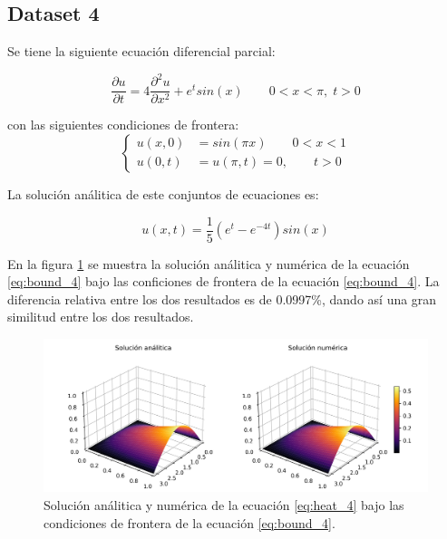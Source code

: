 \subsection{Dataset 4}

Se tiene la siguiente ecuación diferencial parcial:

\begin{equation}
    \frac{\partial u}{\partial t} = 4\frac{\partial^2 u}{\partial x^2}+e^tsin(x)\qquad 0<x<\pi, \; t>0 \label{eq:heat_4}
\end{equation}

con las siguientes condiciones de frontera:
\begin{equation}
    \begin{cases}
        u(x,0) & = sin(\pi x) \qquad 0<x<1 \\
        u(0,t) & =u(\pi,t) = 0, \qquad t>0
    \end{cases} \label{eq:bound_4}
\end{equation}

La solución análitica de este conjuntos de ecuaciones es:

\begin{equation}
    u(x,t)=\frac{1}{5}( e^t-e^{-4t})sin(x) \label{eq:sol_4}
\end{equation}

En la figura \ref{fig:sol_4} se muestra la solución análitica y numérica de la ecuación \ref{eq:bound_4} bajo las conficiones de frontera de la ecuación \ref{eq:bound_4}. La diferencia relativa entre los dos resultados es de 0.0997\%, dando así una gran similitud entre los dos resultados.

\begin{figure}[H]
    \centering
    \includegraphics[width=16cm]{Graphics/surface_4.png}
    \caption{Solución análitica y numérica de la ecuación \ref{eq:heat_4} bajo las condiciones de frontera de la ecuación \ref{eq:bound_4}.}
    \label{fig:sol_4}
\end{figure}
